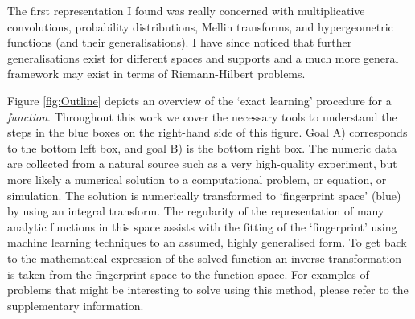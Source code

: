 \documentclass{article}
\begin{document}
The first representation I found was really concerned with multiplicative convolutions, probability distributions, Mellin transforms, and hypergeometric functions (and their generalisations). I have since noticed that further generalisations exist for different spaces and supports and a much more general framework may exist in terms of Riemann-Hilbert problems.

Figure \ref{fig:Outline} depicts an overview of the `exact learning' procedure for a \emph{function}. Throughout this work we cover the necessary tools to understand the steps in the blue boxes on the right-hand side of this figure. Goal A) corresponds to the bottom left box, and goal B) is the bottom right box. The numeric data are collected from a natural source such as a very high-quality experiment, but more likely a numerical solution to a computational problem, or equation, or simulation. The solution is numerically transformed to `fingerprint space' (blue) by using an integral transform. The regularity of the representation of many analytic functions in this space assists with the fitting of the `fingerprint' using machine learning techniques to an assumed, highly generalised form. To get back to the mathematical expression of the solved function an inverse transformation is taken from the  fingerprint space to the function space. For examples of problems that might be interesting to solve using this method, please refer to the supplementary information. \\
\end{document}
